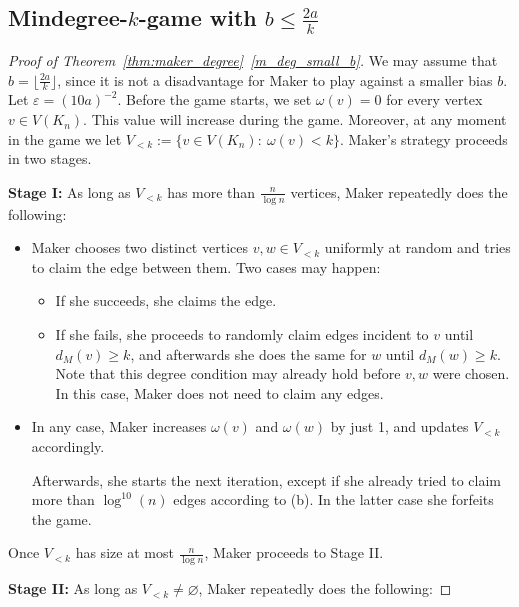 \documentclass[11pt, a4paper]{article}
\numberwithin{equation}{section}
\numberwithin{figure}{section}
\begin{document}
\subsection{Mindegree-$k$-game with $b\leq \frac{2a}{k}$}

\begin{proof}[Proof of Theorem~\ref{thm:maker_degree}~\ref{m_deg_small_b}]
We may assume that $b=\lfloor \frac{2a}{k} \rfloor$,
since it is not a disadvantage for Maker to play against 
a smaller bias $b$. Let $\varepsilon = (10a)^{-2}$.
Before the game starts, we set $\omega(v)=0$
for every vertex $v\in V(K_n)$. This value will
increase during the game.
Moreover, at any moment in the game we let
$V_{<k} := \{v\in V(K_n):~ \omega(v)<k\}.$
Maker's strategy proceeds in two stages.	

\medskip
	
	{\bf Stage I:} As long as $V_{<k}$ has more than 
	$\frac{n}{\log n}$ vertices, Maker repeatedly does the 
	following:
	
	\begin{itemize}
	\item[(1)] Maker chooses two distinct 
	vertices $v,w \in V_{<k}$ uniformly
	at random and tries to claim the edge between them. 
	Two cases may happen:	
	\begin{itemize}
	\item[(a)] 
	If she succeeds, she claims the edge.
	\item[(b)] 
	If she fails, she proceeds to randomly claim edges 
	incident to $v$ until $d_M(v)\geq k$, 
	and afterwards she does the same for $w$ until $d_M(w)\geq k$. 
	Note that this degree condition
	may already hold before $v,w$ were chosen. In this
	case, Maker does not need to claim any edges.
	\end{itemize}
	\item[(2)] In any case, Maker increases 
	$\omega(v)$ and $\omega(w)$ by just 1, 
	and updates $V_{<k}$ accordingly. 
	
	Afterwards, she starts the next iteration, 
	except if she already tried to claim more than 
	$\log^{10}(n)$ edges according to (b). In 
	the latter case she forfeits the game.
	\end{itemize}

    Once $V_{<k}$ has size at most $\frac{n}{\log n}$, Maker 
    proceeds to Stage II.
    
    \medskip
	
	{\bf Stage II:} As long as $V_{<k}\neq \varnothing$, 
	Maker repeatedly does the following:
	

\end{proof}
\end{document}
